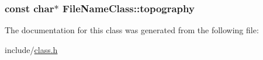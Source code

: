 \subsubsection[{\texorpdfstring{topography}{topography}}]{\setlength{\rightskip}{0pt plus 5cm}const char$\ast$ File\+Name\+Class\+::topography}\hypertarget{class_file_name_class_a46e7b694eeb7e8f02bc5d3ad68ef2d9c}{}\label{class_file_name_class_a46e7b694eeb7e8f02bc5d3ad68ef2d9c}


The documentation for this class was generated from the following file\+:\begin{DoxyCompactItemize}
\item 
include/\hyperlink{class_8h}{class.\+h}\end{DoxyCompactItemize}
